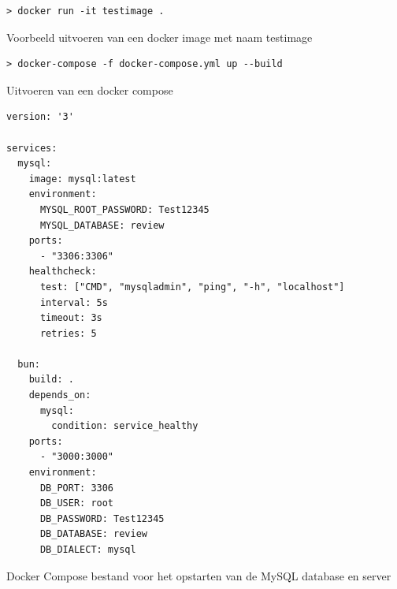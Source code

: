 \begin{listing}[H]
  \centering
  \begin{verbatim}
> docker run -it testimage .
      \end{verbatim}
      \caption{\label{code:dockerrun}Voorbeeld uitvoeren van een docker image met naam testimage}
\end{listing}

\begin{listing}[H]
  \centering
  \begin{verbatim}
> docker-compose -f docker-compose.yml up --build
      \end{verbatim}
      \caption{\label{code:dockercompose}Uitvoeren van een docker compose}
\end{listing}
\begin{listing}[H]
  \centering
  \begin{verbatim}
version: '3'

services:
  mysql:
    image: mysql:latest
    environment:
      MYSQL_ROOT_PASSWORD: Test12345
      MYSQL_DATABASE: review
    ports:
      - "3306:3306"
    healthcheck:
      test: ["CMD", "mysqladmin", "ping", "-h", "localhost"]
      interval: 5s
      timeout: 3s
      retries: 5

  bun:
    build: .
    depends_on:
      mysql:
        condition: service_healthy
    ports:
      - "3000:3000"
    environment:
      DB_PORT: 3306
      DB_USER: root
      DB_PASSWORD: Test12345
      DB_DATABASE: review
      DB_DIALECT: mysql
      \end{verbatim}
      \caption{\label{code:dockercompose}Docker Compose bestand voor het opstarten van de MySQL database en server}
\end{listing}
